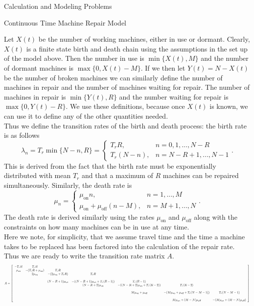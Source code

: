 \documentclass[12pt]{article}
\newcommand\scalemath[2]{\scalebox{#1}{\mbox{\ensuremath{\displaystyle #2}}}}
\numberwithin{equation}{section}
\begin{document}
\begin{section}{Calculation and Modeling Problems}
\begin{subsection}{Continuous Time Machine Repair Model}
\begin{enumerate}
    Let $X(t)$ be the number of working machines, either in use or dormant. Clearly, $X(t)$ is a finite state birth and death chain using the assumptions in the set up of the model above. Then the number in use is $\min\{X(t),M\}$ and the number of dormant machines is $\max\{0,X(t)-M\}$. If we then let $Y(t)=N-X(t)$ be the number of broken machines we can similarly define the number of machines in repair and the number of machines waiting for repair. The number of machines in repair is $\min\{Y(t),R\}$ and the number waiting for repair is $\max\{0,Y(t)-R\}.$ We use these definitions, because once $X(t)$ is known, we can use it to define any of the other quantities needed.\\
    Thus we define the transition rates of the birth and death process:
    the birth rate is as follows
    $$\lambda_n=T_r\min\{N-n,R\}=\left\{\begin{array}{cc}T_r R,&n=0,1,...,N-R\\T_r(N-n),&n=N-R+1,...,N-1\end{array}\right..$$
    This is derived from the fact that the birth rate must be exponentially distributed with mean $T_r$ and that a maximum of $R$ machines can be repaired simultaneously. Similarly, the death rate is
    $$\mu_n=\left\{\begin{array}{cc}\mu_\text{on} n,&n=1,...,M\\ \mu_\text{on}+\mu_\text{off}(n-M),&n=M+1,...,N\end{array}\right..$$
    The death rate is derived similarly using the rates $\mu_\text{on}$ and $\mu_\text{off}$ along with the constraints on how many machines can be in use at any time.\\
    Here we note, for simplicity, that we assume travel time and the time a machine takes to be replaced has been factored into the calculation of the repair rate. Thus we are ready to write the transition rate matrix $A$.
    \[\scalemath{0.55}{A=\left[\begin{array}{ccccccc}
    -T_r R&T_r R\\
    \mu_\text{on}&-(T_r R+\mu_\text{on})&T_r R\\
    &2\mu_\text{on}&-(2\mu_\text{on}+T_r R)&T_r R\\
    \\
    &&(N-R+1)\mu_\text{on}&-((N-R+1)\mu_\text{on}+T_r(R-1))&T_r(R-1)\\
    &&&(N-R+2)\mu_\text{on}&-((N-R+2)\mu_\text{on}+T_r(R-2))&T_r(R-2)\\
    \\
    &&&&M\mu_\text{on}+\mu_\text{off}&-(M\mu_\text{on}+\mu_\text{off}+T_r(N-M-1))&T_r(N-M-1)\\
    \\
    &&&&&M\mu_\text{on}+(M-N)\mu_\text{off}&-(M\mu_\text{on}+(M-N)\mu_\text{off})\end{array}\right]}\]


\end{enumerate}
\end{subsection}
\end{section}
\end{document}
